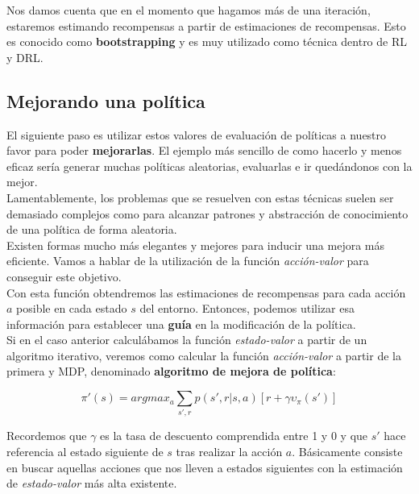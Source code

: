 \documentclass[11pt,fleqn]{book} %
\begin{document}
Nos damos cuenta que en el momento que hagamos más de una iteración, estaremos estimando recompensas a partir de estimaciones de recompensas. Esto es conocido como \textbf{bootstrapping} y es muy utilizado como técnica dentro de RL y DRL.

\subsection{Mejorando una política}

El siguiente paso es utilizar estos valores de evaluación de políticas a nuestro favor para poder \textbf{mejorarlas}. El ejemplo más sencillo de como hacerlo y menos eficaz sería generar muchas políticas aleatorias, evaluarlas e ir quedándonos con la mejor. \\

Lamentablemente, los problemas que se resuelven con estas técnicas suelen ser demasiado complejos como para alcanzar patrones y abstracción de conocimiento de una política de forma aleatoria. \\

Existen formas mucho más elegantes y mejores para inducir una mejora más eficiente. Vamos a hablar de la utilización de la función \textit{acción-valor} para conseguir este objetivo. \\

Con esta función obtendremos las estimaciones de recompensas para cada acción $a$ posible en cada estado $s$ del entorno. Entonces, podemos utilizar esa información para establecer una \textbf{guía} en la modificación de la política. \\

Si en el caso anterior calculábamos la función \textit{estado-valor} a partir de un algoritmo iterativo, veremos como calcular la función \textit{acción-valor} a partir de la primera y MDP, denominado \textbf{algoritmo de mejora de política}:

\begin{equation*}
\pi'(s)=argmax_a\sum_{s',r}p(s',r|s,a)\left[r+\gamma\upsilon_\pi(s')\right]
\end{equation*}

Recordemos que $\gamma$ es la tasa de descuento comprendida entre 1 y 0 y que $s'$ hace referencia al estado siguiente de $s$ tras realizar la acción $a$. Básicamente consiste en buscar aquellas acciones que nos lleven a estados siguientes con la estimación de \textit{estado-valor} más alta existente. \\
\end{document}
